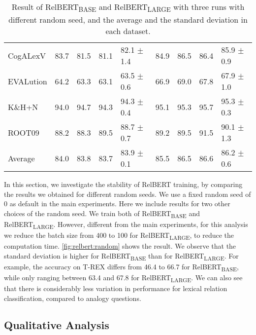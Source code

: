 \documentclass[3p]{elsarticle}
\begin{document}
{\begin{table}[!t]
\begin{tabular}{lccclcccl}
CogALexV   & 83.7    & 81.5    & 81.1    & 82.1 $\pm$1.4     & 84.9     & 86.5     & 86.4    & 85.9 $\pm$0.9    \\
EVALution  & 64.2    & 63.3    & 63.1    & 63.5 $\pm$0.6     & 66.9     & 69.0     & 67.8    & 67.9 $\pm$1.0    \\
K\&H+N     & 94.0    & 94.7    & 94.3    & 94.3 $\pm$0.4     & 95.1     & 95.3     & 95.7    & 95.3 $\pm$0.3    \\
ROOT09     & 88.2    & 88.3    & 89.5    & 88.7 $\pm$0.7     & 89.2     & 89.5     & 91.5    & 90.1 $\pm$1.3    \\\midrule
Average    & 84.0    & 83.8    & 83.7    & 83.9 $\pm$0.1     & 85.5     & 86.5     & 86.6    & 86.2 $\pm$0.6    \\\bottomrule
\end{tabular}
\caption{Result of RelBERT\textsubscript{BASE} and RelBERT\textsubscript{LARGE} with three runs with different random seed, and the average and the standard deviation in each dataset.}
\label{fig:relbert:random}
\end{table}


In this section, we investigate the stability of RelBERT training, by comparing the results we obtained for different random seeds. We use a fixed random seed of 0 as default in the main experiments. Here we include results for two other choices of the random seed. We train both of RelBERT\textsubscript{BASE} and RelBERT\textsubscript{LARGE}. However, different from the main experiments, for this analysis we reduce the batch size from 400 to 100 for RelBERT\textsubscript{LARGE}, to reduce the computation time. \autoref{fig:relbert:random} shows the result. We observe that the standard deviation is higher for RelBERT\textsubscript{BASE} than  for RelBERT\textsubscript{LARGE}. For example, the accuracy on T-REX  differs from 46.4 to 66.7 for RelBERT\textsubscript{BASE}, while only ranging between 63.4 and 67.8 for RelBERT\textsubscript{LARGE}. We can also see that there is considerably less variation in performance for lexical relation classification, compared to analogy questions.




\subsection{Qualitative Analysis} \label{sec:relbert:qualitative-analysis}

}
\end{document}
